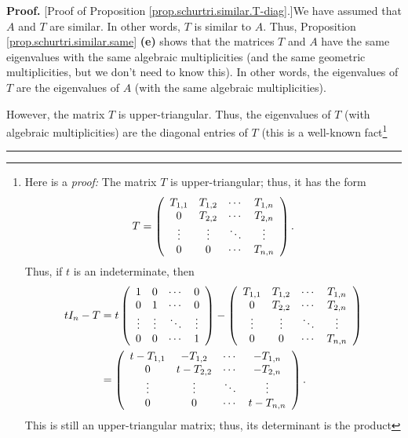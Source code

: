 \documentclass[numbers=enddot,12pt,final,onecolumn,notitlepage]{scrartcl}%
\numberwithin{exer}{subsection}
\theoremstyle{definition}
\newenvironment{proof}[1][Proof]{\noindent\textbf{#1.} }{\ \rule{0.5em}{0.5em}}
\begin{document}
\begin{proof}
[Proof of Proposition \ref{prop.schurtri.similar.T-diag}.]We have assumed that
$A$ and $T$ are similar. In other words, $T$ is similar to $A$. Thus,
Proposition \ref{prop.schurtri.similar.same} \textbf{(e)} shows that the
matrices $T$ and $A$ have the same eigenvalues with the same algebraic
multiplicities (and the same geometric multiplicities, but we don't need to
know this). In other words, the eigenvalues of $T$ are the eigenvalues of $A$
(with the same algebraic multiplicities).

However, the matrix $T$ is upper-triangular. Thus, the eigenvalues of $T$
(with algebraic multiplicities) are the diagonal entries of $T$ (this is a
well-known fact\footnote{Here is a \textit{proof:} The matrix $T$ is
upper-triangular; thus, it has the form
\[
T=\left(
\begin{array}
[c]{cccc}%
T_{1,1} & T_{1,2} & \cdots & T_{1,n}\\
0 & T_{2,2} & \cdots & T_{2,n}\\
\vdots & \vdots & \ddots & \vdots\\
0 & 0 & \cdots & T_{n,n}%
\end{array}
\right)  .
\]
Thus, if $t$ is an indeterminate, then
\begin{align*}
tI_{n}-T  &  =t\left(
\begin{array}
[c]{cccc}%
1 & 0 & \cdots & 0\\
0 & 1 & \cdots & 0\\
\vdots & \vdots & \ddots & \vdots\\
0 & 0 & \cdots & 1
\end{array}
\right)  -\left(
\begin{array}
[c]{cccc}%
T_{1,1} & T_{1,2} & \cdots & T_{1,n}\\
0 & T_{2,2} & \cdots & T_{2,n}\\
\vdots & \vdots & \ddots & \vdots\\
0 & 0 & \cdots & T_{n,n}%
\end{array}
\right) \\
&  =\left(
\begin{array}
[c]{cccc}%
t-T_{1,1} & -T_{1,2} & \cdots & -T_{1,n}\\
0 & t-T_{2,2} & \cdots & -T_{2,n}\\
\vdots & \vdots & \ddots & \vdots\\
0 & 0 & \cdots & t-T_{n,n}%
\end{array}
\right)  .
\end{align*}
This is still an upper-triangular matrix; thus, its determinant is the product
}
\end{proof}
\end{document}
